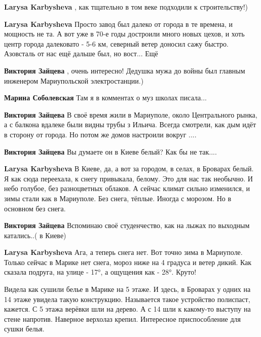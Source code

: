 \begin{itemize}
\begin{itemize}
\begin{itemize}
\textbf{Larysa Karbysheva} , как тщательно в том веке подходили к строительству!)

\textbf{Larysa Karbysheva} Просто завод был далеко от города в те времена, и мощность не та. А вот уже в 70-е годы достроили много новых цехов, и хоть центр города далековато - 5-6 км, северный ветер доносил сажу быстро. Азовсталь от нас ещё дальше был, но вост... Ещё

\textbf{Виктория Зайцева} , очень интересно! Дедушка мужа до войны был главным инженером Мариупольской электростанции.)

\textbf{Марина Соболевская} Там я в комментах о муз школах писала...

\textbf{Виктория Зайцева} В своё время жили в Мариуполе, около Центрального рынка, а с балкона вдалеке были видны трубы з Ильича. Всегда смотрели, как дым идёт в сторону от города. Но потом же домов настроили вокруг ....

\textbf{Виктория Зайцева} Вы думаете он в Киеве белый? Как бы не так....

\textbf{Larysa Karbysheva} В Киеве, да, а вот за городом, в селах, в Броварах белый. Я как сюда переехала, к снегу привыкала, белому. Это для нас так необычно. И небо голубое, без разноцветных облаков. А сейчас климат сильно изменился, и зимы стали как в Мариуполе. Без снега, тёплые. Иногда с морозом. Но в основном без снега.

\textbf{Виктория Зайцева} Вспоминаю своё студенчество, как на лыжах по выходным катались..( в Киеве)

\textbf{Larysa Karbysheva} Ага, а теперь снега нет. Вот точно зима в Мариуполе. Только сейчас в Марике нет снега, мороз ниже на 4 градуса и ветер дикий. Как сказала подруга, на улице - 17°, а ощущения как - 28°. Круто!

\end{itemize} %

\end{itemize} %


Видела как сушили белье в Марике на 5 этаже. И здесь, в Броварах у одних на 14
этаже увидела такую конструкцию. Называется такое устройство полиспаст,
кажется. С 5 этажа верёвки шли на дерево. А с 14 шли к какому-то выступу на
стене напротив. Наверное верхолаз крепил. Интересное приспособление для сушки
белья.



\end{itemize}
